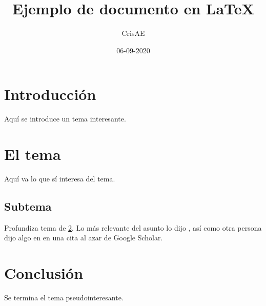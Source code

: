 \documentclass{article}
\title{Ejemplo de documento en LaTeX}
\date{06-09-2020}
\author{CrisAE}
\begin{document}
\maketitle

\section{Introducción} Aquí se introduce un tema interesante.
\section{El tema}\label{tema}
 Aquí va lo que sí interesa del tema.
\subsection{Subtema}
Profundiza tema de \ref{tema}. Lo más relevante del asunto lo dijo \citet{libro}, así como otra persona dijo algo en \citep{dorigo2006ant} en una cita al azar de Google Scholar.

\section{Conclusión} Se termina el tema pseudointeresante.



\end{document}
